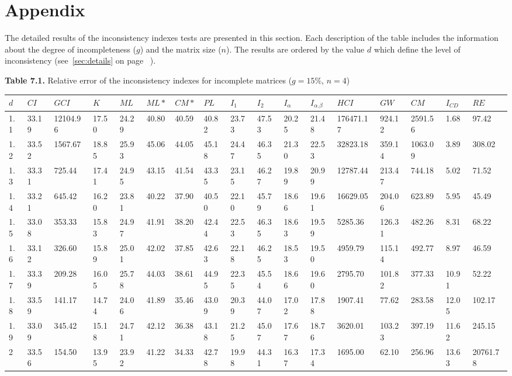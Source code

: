 \chapter{Appendix}
The detailed results of the inconsistency indexes tests are presented in this section. Each description of the table includes the information about the degree of incompleteness ($g$) and the matrix size ($n$). The results are ordered by the value $d$ which define the level of inconsistency (see~\ref{sec:details} on page ~\pageref{sec:details}).





\newpage
\textbf{Table 7.1.} Relative error of the inconsistency indexes for incomplete matrices ($g=15\%$, $n=4$)
\begin{adjustbox}{angle=90}
  \begin{center}
    \small{
    \begin{tabular}{|l|llllllllllllllll|}
      \hline $d$&$CI$&$GCI$&$K$&$ML$&$ML*$&$CM*$&$PL$&$I_1$&$I_2$&$I_{\alpha}$&$I_{\alpha.\beta}$&$HCI$&$GW$&$CM$&$I_{CD}$&$RE$\\ \hline \hline
1.1&33.19&12104.96&17.50&24.29&40.80&40.59&40.82&23.73&47.53&20.25&21.48&176471.17&924.12&2591.56&1.68&97.42  \\ 
1.2&33.52&1567.67&18.85&25.93&45.06&44.05&45.18&24.47&46.35&21.30&22.53&32823.18&359.14&1063.09&3.89&308.02  \\ 
1.3&33.31&725.44&17.41&24.95&43.15&41.54&43.35&23.15&46.27&19.89&20.99&12787.44&213.47&744.18&5.02&71.52  \\ 
1.4&33.21&645.42&16.20&23.81&40.22&37.90&40.50&22.10&45.79&18.66&19.61&16629.05&204.06&623.89&5.95&45.49  \\ 
1.5&33.08&353.33&15.83&24.97&41.91&38.20&42.44&22.53&46.35&18.63&19.59&5285.36&126.31&482.26&8.31&68.22  \\ 
1.6&33.12&326.60&15.89&25.01&42.02&37.85&42.63&22.18&46.25&18.53&19.50&4959.79&115.14&492.77&8.97&46.59  \\ 
1.7&33.39&209.28&16.05&25.78&44.03&38.61&44.95&22.35&45.54&18.66&19.60&2795.70&101.82&377.33&10.91&52.22  \\ 
1.8&33.59&141.17&14.74&24.06&41.89&35.46&43.09&20.39&44.07&17.02&17.88&1907.41&77.62&283.58&12.05&102.17  \\ 
1.9&33.09&345.42&15.18&24.71&42.12&36.38&43.18&21.25&45.07&17.67&18.76&3620.01&103.23&397.19&11.62&245.15  \\ 
2&33.56&154.50&13.95&23.92&41.22&34.33&42.78&19.98&44.31&16.37&17.34&1695.00&62.10&256.96&13.63&20761.78  \\ 

\end{tabular}}
\end{center}
\end{adjustbox}
